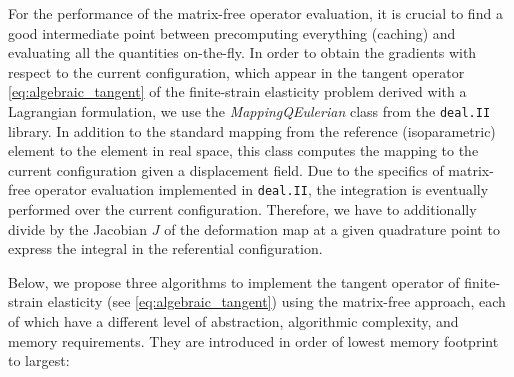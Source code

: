 \documentclass[AMA,STIX1COL]{WileyNJD-v2}
\begin{document}
For the performance of the matrix-free operator evaluation, it is crucial to find a good intermediate point
between precomputing everything (caching) and evaluating all the quantities on-the-fly.
%
In order to obtain the gradients with respect to the current configuration,
which appear in the tangent operator \eqref{eq:algebraic_tangent} of the finite-strain elasticity problem derived with a Lagrangian formulation,
we use the \textit{MappingQEulerian} class from the \texttt{deal.II} \cite{dealII91} library.
In addition to the standard mapping from the reference (isoparametric) element to the element in real space, this class computes the mapping
to the current configuration given a displacement field.
%
Due to the specifics of matrix-free operator evaluation implemented in \texttt{deal.II}, the integration is eventually performed over the current configuration.
Therefore, we have to additionally divide by the Jacobian $J$ of the deformation map at a given quadrature point to express the integral in the referential configuration.

Below, we propose three algorithms to implement the tangent operator of finite-strain elasticity (see \eqref{eq:algebraic_tangent})
using the matrix-free approach, each of which have a different level of abstraction, algorithmic complexity, and memory requirements.
They are introduced in order of lowest memory footprint to largest:
\end{document}
